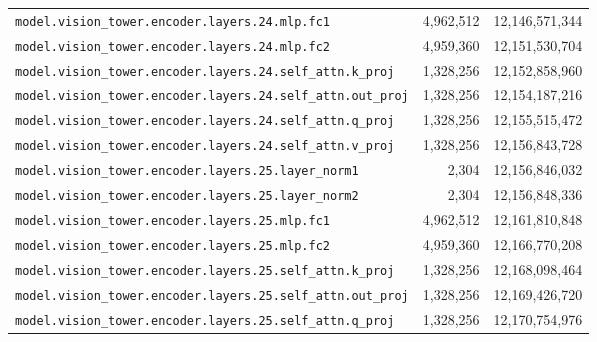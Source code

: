 \documentclass[10pt,a4paper]{article}
\theoremstyle{definition}
\begin{document}
\begin{appendices}
\begin{longtable}{p{9.5cm}rr}
\texttt{model.\allowbreak{}vision\_tower.\allowbreak{}encoder.\allowbreak{}layers.\allowbreak{}24.\allowbreak{}mlp.\allowbreak{}fc1} & 4,962,512 & 12,146,571,344 \\
\texttt{model.\allowbreak{}vision\_tower.\allowbreak{}encoder.\allowbreak{}layers.\allowbreak{}24.\allowbreak{}mlp.\allowbreak{}fc2} & 4,959,360 & 12,151,530,704 \\
\texttt{model.\allowbreak{}vision\_tower.\allowbreak{}encoder.\allowbreak{}layers.\allowbreak{}24.\allowbreak{}self\_attn.\allowbreak{}k\_proj} & 1,328,256 & 12,152,858,960 \\
\texttt{model.\allowbreak{}vision\_tower.\allowbreak{}encoder.\allowbreak{}layers.\allowbreak{}24.\allowbreak{}self\_attn.\allowbreak{}out\_proj} & 1,328,256 & 12,154,187,216 \\
\texttt{model.\allowbreak{}vision\_tower.\allowbreak{}encoder.\allowbreak{}layers.\allowbreak{}24.\allowbreak{}self\_attn.\allowbreak{}q\_proj} & 1,328,256 & 12,155,515,472 \\
\texttt{model.\allowbreak{}vision\_tower.\allowbreak{}encoder.\allowbreak{}layers.\allowbreak{}24.\allowbreak{}self\_attn.\allowbreak{}v\_proj} & 1,328,256 & 12,156,843,728 \\
\texttt{model.\allowbreak{}vision\_tower.\allowbreak{}encoder.\allowbreak{}layers.\allowbreak{}25.\allowbreak{}layer\_norm1} & 2,304 & 12,156,846,032 \\
\texttt{model.\allowbreak{}vision\_tower.\allowbreak{}encoder.\allowbreak{}layers.\allowbreak{}25.\allowbreak{}layer\_norm2} & 2,304 & 12,156,848,336 \\
\texttt{model.\allowbreak{}vision\_tower.\allowbreak{}encoder.\allowbreak{}layers.\allowbreak{}25.\allowbreak{}mlp.\allowbreak{}fc1} & 4,962,512 & 12,161,810,848 \\
\texttt{model.\allowbreak{}vision\_tower.\allowbreak{}encoder.\allowbreak{}layers.\allowbreak{}25.\allowbreak{}mlp.\allowbreak{}fc2} & 4,959,360 & 12,166,770,208 \\
\texttt{model.\allowbreak{}vision\_tower.\allowbreak{}encoder.\allowbreak{}layers.\allowbreak{}25.\allowbreak{}self\_attn.\allowbreak{}k\_proj} & 1,328,256 & 12,168,098,464 \\
\texttt{model.\allowbreak{}vision\_tower.\allowbreak{}encoder.\allowbreak{}layers.\allowbreak{}25.\allowbreak{}self\_attn.\allowbreak{}out\_proj} & 1,328,256 & 12,169,426,720 \\
\texttt{model.\allowbreak{}vision\_tower.\allowbreak{}encoder.\allowbreak{}layers.\allowbreak{}25.\allowbreak{}self\_attn.\allowbreak{}q\_proj} & 1,328,256 & 12,170,754,976 \\

\end{longtable}
\end{appendices}
\end{document}
